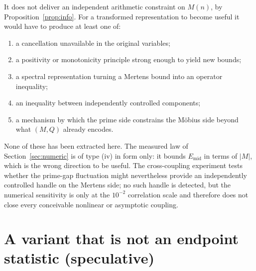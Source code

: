 \documentclass[11pt]{amsart}
\numberwithin{equation}{section}
\theoremstyle{plain}
\theoremstyle{definition}
\theoremstyle{remark}
\newcommand{\Mert}{M}
\newcommand{\Sq}{Q}
\begin{document}
It does not deliver an independent arithmetic constraint on $\Mert(n)$, by
Proposition~\ref{prop:info}. For a transformed representation to become useful
it would have to produce at least one of:
\begin{enumerate}[label=(\roman*)]
\item a cancellation unavailable in the original variables;
\item a positivity or monotonicity principle strong enough to yield new bounds;
\item a spectral representation turning a Mertens bound into an operator inequality;
\item an inequality between independently controlled components;
\item a mechanism by which the prime side constrains the M\"obius side beyond
what $(\Mert,\Sq)$ already encodes.
\end{enumerate}
None of these has been extracted here. The measured law of
Section~\ref{sec:numeric} is of type (iv) in form only: it bounds
$E_{\mathrm{mid}}$ in terms of $|\Mert|$, which is the wrong direction to be
useful. The cross-coupling experiment tests whether the prime-gap fluctuation
might nevertheless provide an independently controlled handle on the Mertens
side; no such handle is detected, but the numerical sensitivity is only at the
$10^{-2}$ correlation scale and therefore does not close every conceivable
nonlinear or asymptotic coupling.

\section{A variant that is not an endpoint statistic (speculative)}
\label{sec:shared-counter}
\end{document}
